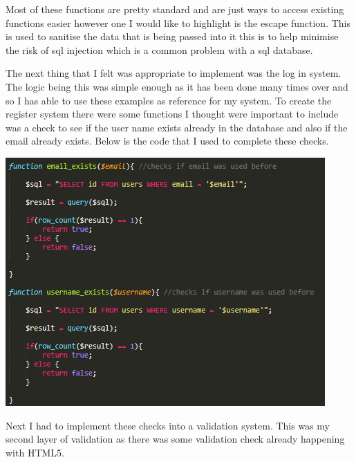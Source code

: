 Most of these functions are pretty standard and are just ways to access existing functions easier however one I would like to highlight is the escape function. This is used to sanitise the data that is being passed into it this is to help minimise the risk of sql injection which is a common problem with a sql database.

The next thing that I felt was appropriate to implement was the log in system. The logic being this was simple enough as it has been done many times over and so I has able to use these examples as reference for my system. To create the register system there were some functions I thought were important to include was a check to see if the user name exists already in the database and also if the email already exists. Below is the code that I used to complete these checks.

\includegraphics[width=\textwidth,height=\textheight,keepaspectratio]{img/emain-user-check.png}

Next I had to implement these checks into a validation system. This was my second layer of validation as there was some validation check already happening with HTML5.

